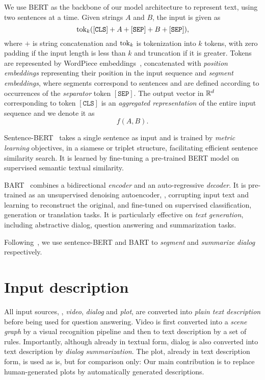 \documentclass[10pt,twocolumn,letterpaper]{article}
\begin{document}
We use BERT as the backbone of our model architecture to represent text, using two sentences at a time. Given strings $A$ and $B$, the input is given as
\begin{equation}
	\operatorname{tok}_k(\mathtt{[CLS]} + A + \mathtt{[SEP]} + B + \mathtt{[SEP]}),
\label{eq:bert-in}
\end{equation}
where $+$ is string concatenation and $\operatorname{tok}_k$ is tokenization into $k$ tokens, with zero padding if the input length is less than $k$ and truncation if it is greater. Tokens are represented by WordPiece embeddings~\cite{ScNa12,wu2016google}, concatenated with \emph{position embeddings} representing their position in the input sequence and \emph{segment embeddings}, where segments correspond to sentences and are defined according to occurrences of the \emph{separator} token $\mathtt{[SEP]}$. The output vector in $\mathbb{R}^d$ corresponding to token $\mathtt{[CLS]}$ is an \emph{aggregated representation} of the entire input sequence and we denote it as
\begin{equation}
	f(A, B).
\label{eq:bert-out}
\end{equation}

Sentence-BERT~\cite{reimers-gurevych-2019-sentence} takes a single sentence as input and is trained by \emph{metric learning} objectives, \eg in a siamese or triplet structure, facilitating efficient sentence similarity search. It is learned by fine-tuning a pre-trained BERT model on supervised semantic textual similarity.

BART~\cite{lewis2020bart} combines a bidirectional \emph{encoder} and an auto-regressive \emph{decoder}. It is pre-trained as an unsupervised denoising autoencoder, \ie, corrupting input text and learning to reconstruct the original, and fine-tuned on supervised classification, generation or translation tasks. It is particularly effective on \emph{text generation}, including abstractive dialog, question answering and summarization tasks.

Following~\cite{chen2020multi}, we use sentence-BERT and BART to \emph{segment} and \emph{summarize dialog} respectively. \section{Input description}
\label{sec:input}

All input sources, \ie, \emph{video}, \emph{dialog} and \emph{plot}, are converted into \emph{plain text description} before being used for question answering. Video is first converted into a \emph{scene graph} by a visual recognition pipeline and then to text description by a set of rules. Importantly, although already in textual form, dialog is also converted into text description by \emph{dialog summarization}. The plot, already in text description form, is used as is, but for comparison only: Our main contribution is to replace human-generated plots by automatically generated descriptions.
\end{document}
